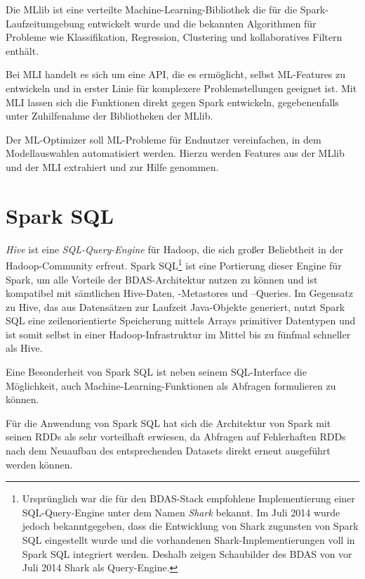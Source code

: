 Die MLlib ist eine verteilte Machine-Learning-Bibliothek die für die Spark-Laufzeitumgebung entwickelt wurde und die bekannten Algorithmen für Probleme wie Klassifikation, Regression, Clustering und kollaboratives Filtern enthält.

Bei MLI handelt es sich um eine API, die es ermöglicht, selbst ML-Features zu entwickeln und in erster Linie für komplexere Problemstellungen geeignet ist. Mit MLI lassen sich die Funktionen direkt gegen Spark entwickeln, gegebenenfalls unter Zuhilfenahme der Bibliotheken der MLlib.

Der ML-Optimizer soll ML-Probleme für Endnutzer vereinfachen, in dem Modellauswahlen automatisiert werden. Hierzu werden Features aus der MLlib und der MLI extrahiert und zur Hilfe genommen.



\section{Spark SQL}
\label{section:spark SQL}


\textit{Hive} ist eine \textit{SQL-Query-Engine} für Hadoop, die sich großer Beliebtheit in der Hadoop-Community erfreut. Spark SQL\footnote{Ursprünglich war die für den BDAS-Stack empfohlene Implementierung einer SQL-Query-Engine unter dem Namen \textit{Shark} bekannt. Im Juli 2014 wurde jedoch bekanntgegeben, dass die Entwicklung von Shark zugunsten von Spark SQL eingestellt wurde und die vorhandenen Shark-Implementierungen voll in Spark SQL integriert werden. Deshalb zeigen Schaubilder des BDAS von vor Juli 2014 Shark als Query-Engine.} ist eine Portierung dieser Engine für Spark, um alle Vorteile der BDAS-Architektur nutzen zu können und ist kompatibel mit sämtlichen Hive-Daten, -Metastores und –Queries. Im Gegensatz zu Hive, das aus Datensätzen zur Laufzeit Java-Objekte generiert, nutzt Spark SQL eine zeilenorientierte Speicherung mittels Arrays primitiver Datentypen und ist somit selbst in einer Hadoop-Infrastruktur im Mittel bis zu fünfmal schneller als Hive. 

Eine Besonderheit von Spark SQL ist neben seinem SQL-Interface die Möglichkeit, auch Machine-Learning-Funktionen als Abfragen formulieren zu können. 

Für die Anwendung von Spark SQL hat sich die Architektur von Spark mit seinen RDDs als sehr vorteilhaft erwiesen, da Abfragen auf Fehlerhaften RDDs nach dem Neuaufbau des entsprechenden Datasets direkt erneut ausgeführt werden können. 

